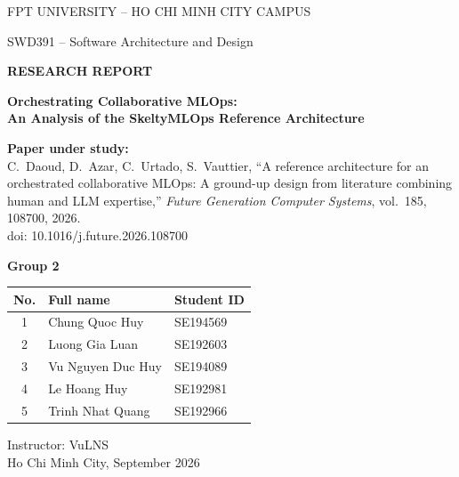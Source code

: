 \documentclass[11pt,a4paper]{article}
\begin{document}
\begin{titlepage}
\thispagestyle{empty}
\centering
{\large FPT UNIVERSITY -- HO CHI MINH CITY CAMPUS\par}
\vspace{0.3cm}
{\large SWD391 -- Software Architecture and Design\par}
\vspace{1.2cm}
{\Large\bfseries RESEARCH REPORT\par}
\vspace{0.8cm}
{\huge\bfseries Orchestrating Collaborative MLOps:\\[4pt] An Analysis of the SkeltyMLOps Reference Architecture\par}
\vspace{1.2cm}
{\bfseries Paper under study:}\\[3pt]
C.~Daoud, D.~Azar, C.~Urtado, S.~Vauttier, ``A reference architecture for an orchestrated collaborative MLOps: A ground-up design from literature combining human and LLM expertise,'' \emph{Future Generation Computer Systems}, vol.~185, 108700, 2026.\\
doi: 10.1016/j.future.2026.108700
\vspace{1.2cm}

{\bfseries Group 2}\\[6pt]
\begin{tabular}{@{}cll@{}}
\toprule
No. & Full name & Student ID \\
\midrule
1 & Chung Quoc Huy & SE194569 \\
2 & Luong Gia Luan & SE192603 \\
3 & Vu Nguyen Duc Huy & SE194089 \\
4 & Le Hoang Huy & SE192981 \\
5 & Trinh Nhat Quang & SE192966 \\
\bottomrule
\end{tabular}
\vfill
Instructor: VuLNS\\[4pt]
Ho Chi Minh City, September 2026
\end{titlepage}
\end{document}
